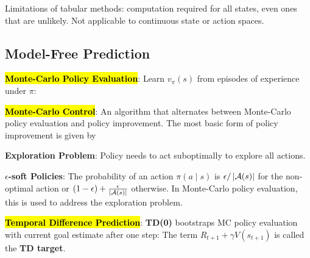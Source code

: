 \documentclass{article}
\begin{document}
  Limitations of tabular methods: computation required for all states, even ones that are unlikely. Not applicable to continuous state or action spaces.

\subsection{Model-Free Prediction}

  \hl{\textbf{Monte-Carlo Policy Evaluation}}: Learn $v_\pi(s)$ from episodes of experience under $\pi$:

  \hl{\textbf{Monte-Carlo Control}}: An algorithm that alternates between Monte-Carlo policy evaluation and policy improvement. The most basic form of policy improvement is given by

  \textbf{Exploration Problem}: Policy needs to act suboptimally to explore all actions.

  \textbf{$\epsilon$-soft Policies}: The probability of an action $\pi(a\mid s)$ is $\epsilon/\left\lvert \mathcal{A}(s) \right\rvert$ for the non-optimal action or $(1-\epsilon)+\frac{\epsilon}{\left\lvert \mathcal{A}(s) \right\rvert}$ otherwise. In Monte-Carlo policy evaluation, this is used to address the exploration problem.

  \hl{\textbf{Temporal Difference Prediction}}: \textbf{TD(0)} bootstraps MC policy evaluation with current goal estimate after one step:
  The term $R_{t+1}+\gamma V(s_{t+1})$ is called the \textbf{TD target}.
\end{document}
